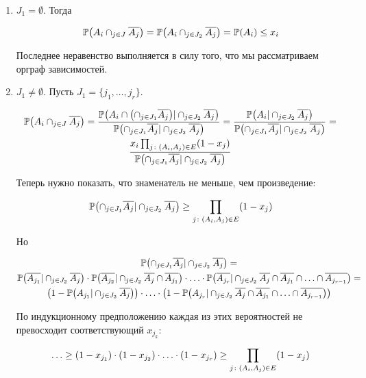\documentclass[12pt]{article}
\DeclarePairedDelimiter\autobracket{(}{)}
\newcommand{\br}[1]{\autobracket*{#1}}
\renewcommand{\P}{\mathbb{P}}
\begin{document}
\begin{enumerate}
\item $J_1 = \emptyset$. Тогда

\[
\P \br{A_i \cap_{j \in J} \overline{A_j}} =
\P \br{A_i \cap_{j \in J_2} \overline{A_j}} = \P \br{A_i} \leq x_i
\]

Последнее неравенство выполняется в силу того, что мы рассматриваем орграф зависимостей.

\item $J_1 \neq \emptyset$. Пусть $J_1 = \{ j_1, \ldots, j_r \}$.

\begin{multline*}
\P \br{A_i \cap_{j \in J} \overline{A_j}} =
\frac {
\P \br{A_i \cap \br{ \cap_{j \in J_1} \overline{A_j}} | \cap_{j \in J_2} \overline{A_j} }
} {
\P \br{\cap_{j \in J_1} \overline{A_j} | \cap_{j \in J_2} \overline{A_j} }
} =
\frac {
\P \br{A_i | \cap_{j \in J_2} \overline{A_j} }
} {
\P \br{\cap_{j \in J_1} \overline{A_j} | \cap_{j \in J_2} \overline{A_j} }
} = \\
\frac {x_i \prod_{j \colon (A_i, A_j) \in E} (1 - x_j)} {\P \br{\cap_{j \in J_1} \overline{A_j} | \cap_{j \in J_2} \overline{A_j} }}
\end{multline*}

Теперь нужно показать, что знаменатель не меньше, чем произведение:

\[
\P \br{\cap_{j \in J_1} \overline{A_j} | \cap_{j \in J_2} \overline{A_j} } \geq
\prod_{j \colon (A_i, A_j) \in E} (1 - x_j)
\]

Но

\begin{multline*}
\P \br{\cap_{j \in J_1} \overline{A_j} | \cap_{j \in J_2} \overline{A_j} } = \\
\P \br{\overline{A_{j_1}} | \cap_{j \in J_2} \overline{A_j} } \cdot
\P \br{\overline{A_{j_2}} | \cap_{j \in J_2} \overline{A_j} \cap \overline{A_{j_1}} } \cdot \ldots \cdot
\P \br{\overline{A_{j_r}} | \cap_{j \in J_2} \overline{A_j} \cap \overline{A_{j_1}} \cap \ldots \cap \overline{A_{j_{r - 1}}} } = \\
\br{ 1 - \P \br{A_{j_1} | \cap_{j \in J_2} \overline{A_j} } }
\cdot \ldots \cdot
\br{ 1 - \P \br{A_{j_r} | \cap_{j \in J_2} \overline{A_j} \cap \overline{A_{j_1}} \cap \ldots \cap \overline{A_{j_{r - 1}}} } }
\end{multline*}

По индукционному предположению каждая из этих вероятностей не превосходит соответствующий $x_{j_k}$:

\[
\ldots \geq \br{1 - x_{j_1}} \cdot \br{1 - x_{j_2}} \cdot \ldots \cdot \br{1 - x_{j_r}}
\geq \prod_{j \colon (A_i, A_j) \in E} (1 - x_j)
\]

\end{enumerate}
\end{document}
